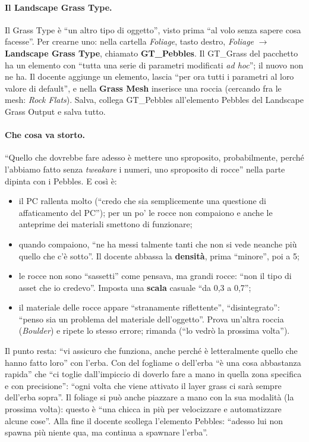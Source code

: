 \paragraph{Il Landscape Grass Type.} Il Grass Type è ``un altro tipo di oggetto'', visto
prima ``al volo senza sapere cosa facesse''. Per crearne uno: nella cartella \emph{Foliage},
tasto destro, \emph{Foliage} $\rightarrow$ \textbf{Landscape Grass Type}, chiamato
\textbf{GT\_Pebbles}. Il GT\_Grass del pacchetto ha un elemento con ``tutta una serie di
parametri modificati \emph{ad hoc}''; il nuovo non ne ha. Il docente aggiunge un elemento,
lascia ``per ora tutti i parametri al loro valore di default'', e nella \textbf{Grass Mesh}
inserisce una roccia (cercando fra le mesh: \emph{Rock Flats}). Salva, collega GT\_Pebbles
all'elemento Pebbles del Landscape Grass Output e salva tutto.

\paragraph{Che cosa va storto.} ``Quello che dovrebbe fare adesso è mettere uno
sproposito, probabilmente, perché l'abbiamo fatto senza \emph{tweakare} i numeri, uno
sproposito di rocce'' nella parte dipinta con i Pebbles. E così è:
\begin{itemize}
  \item il PC rallenta molto (``credo che sia semplicemente una questione di affaticamento
        del PC''); per un po' le rocce non compaiono e anche le anteprime dei materiali
        smettono di funzionare;
  \item quando compaiono, ``ne ha messi talmente tanti che non si vede neanche più quello che
        c'è sotto''. Il docente abbassa la \textbf{densità}, prima ``minore'', poi a 5;
  \item le rocce non sono ``sassetti'' come pensava, ma grandi rocce: ``non il tipo di asset
        che io credevo''. Imposta una \textbf{scala} casuale ``da 0,3 a 0,7'';
  \item il materiale delle rocce appare ``stranamente riflettente'', ``disintegrato'': ``penso
        sia un problema del materiale dell'oggetto''. Prova un'altra roccia (\emph{Boulder}) e
        ripete lo stesso errore; rimanda (``lo vedrò la prossima volta'').
\end{itemize}
Il punto resta: ``vi assicuro che funziona, anche perché è letteralmente quello che hanno
fatto loro'' con l'erba. Con del fogliame o dell'erba ``è una cosa abbastanza rapida'' che
``ci toglie dall'impiccio di doverlo fare a mano in quella zona specifica e con
precisione'': ``ogni volta che viene attivato il layer grass ci sarà sempre dell'erba sopra''.
Il foliage si può anche piazzare a mano con la sua modalità (la prossima volta): questo è
``una chicca in più per velocizzare e automatizzare alcune cose''. Alla fine il docente
scollega l'elemento Pebbles: ``adesso lui non spawna più niente qua, ma continua a spawnare
l'erba''.


